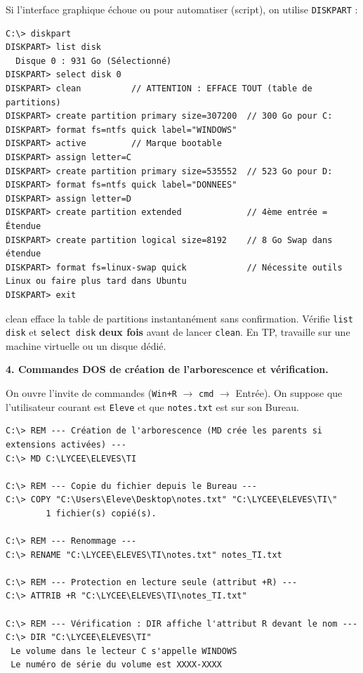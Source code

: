 \documentclass[11pt]{article}
\newcommand{\cle}[1]{{\popxbold\color{popdark}#1}}
\begin{document}
\begin{exoresolu}
\begin{methode}
Si l'interface graphique échoue ou pour automatiser (script), on utilise \texttt{DISKPART} :
\begin{lstlisting}
C:\> diskpart
DISKPART> list disk
  Disque 0 : 931 Go (Sélectionné)
DISKPART> select disk 0
DISKPART> clean          // ATTENTION : EFFACE TOUT (table de partitions)
DISKPART> create partition primary size=307200  // 300 Go pour C:
DISKPART> format fs=ntfs quick label="WINDOWS"
DISKPART> active         // Marque bootable
DISKPART> assign letter=C
DISKPART> create partition primary size=535552  // 523 Go pour D:
DISKPART> format fs=ntfs quick label="DONNEES"
DISKPART> assign letter=D
DISKPART> create partition extended             // 4ème entrée = Étendue
DISKPART> create partition logical size=8192    // 8 Go Swap dans étendue
DISKPART> format fs=linux-swap quick            // Nécessite outils Linux ou faire plus tard dans Ubuntu
DISKPART> exit
\end{lstlisting}
\begin{attention}
\cle{clean} efface la table de partitions instantanément sans confirmation. Vérifie \texttt{list disk} et \texttt{select disk} \textbf{deux fois} avant de lancer \texttt{clean}. En TP, travaille sur une machine virtuelle ou un disque dédié.
\end{attention}
\end{methode}

\textbf{4. Commandes DOS de création de l'arborescence et vérification.}

On ouvre l'invite de commandes (\texttt{Win+R} $\rightarrow$ \texttt{cmd} $\rightarrow$ Entrée). On suppose que l'utilisateur courant est \texttt{Eleve} et que \texttt{notes.txt} est sur son Bureau.

\begin{lstlisting}
C:\> REM --- Création de l'arborescence (MD crée les parents si extensions activées) ---
C:\> MD C:\LYCEE\ELEVES\TI

C:\> REM --- Copie du fichier depuis le Bureau ---
C:\> COPY "C:\Users\Eleve\Desktop\notes.txt" "C:\LYCEE\ELEVES\TI\"
        1 fichier(s) copié(s).

C:\> REM --- Renommage ---
C:\> RENAME "C:\LYCEE\ELEVES\TI\notes.txt" notes_TI.txt

C:\> REM --- Protection en lecture seule (attribut +R) ---
C:\> ATTRIB +R "C:\LYCEE\ELEVES\TI\notes_TI.txt"

C:\> REM --- Vérification : DIR affiche l'attribut R devant le nom ---
C:\> DIR "C:\LYCEE\ELEVES\TI"
 Le volume dans le lecteur C s'appelle WINDOWS
 Le numéro de série du volume est XXXX-XXXX


\end{lstlisting}
\end{exoresolu}
\end{document}
